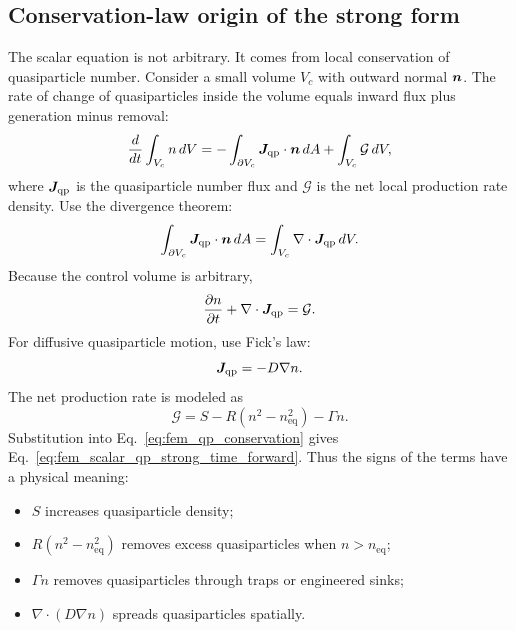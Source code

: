 \documentclass[11pt]{article}
\newcommand{\eq}{\mathrm{eq}}
\begin{document}
\subsection{Conservation-law origin of the strong form}
The scalar equation is not arbitrary. It comes from local conservation of quasiparticle number. Consider a small volume $V_c$ with outward normal $\bm{n}$. The rate of change of quasiparticles inside the volume equals inward flux plus generation minus removal:
\begin{equation}
\frac{d}{dt}\int_{V_c} n\,dV
= -\int_{\partial V_c}\bm{J}_{\mathrm{qp}}\cdot\bm{n}\,dA
+\int_{V_c} \mathcal{G}\,dV,
\end{equation}
where $\bm{J}_{\mathrm{qp}}$ is the quasiparticle number flux and $\mathcal{G}$ is the net local production rate density. Use the divergence theorem:
\begin{equation}
\int_{\partial V_c}\bm{J}_{\mathrm{qp}}\cdot\bm{n}\,dA
=\int_{V_c}\nabla\cdot\bm{J}_{\mathrm{qp}}\,dV.
\end{equation}
Because the control volume is arbitrary,
\begin{equation}
\frac{\partial n}{\partial t}+\nabla\cdot\bm{J}_{\mathrm{qp}}=\mathcal{G}.
\label{eq:fem_qp_conservation}
\end{equation}
For diffusive quasiparticle motion, use Fick's law:
\begin{equation}
\bm{J}_{\mathrm{qp}}=-D\nabla n.
\label{eq:fem_fick_qp}
\end{equation}
The net production rate is modeled as
\begin{equation}
\mathcal{G}=S-R(n^2-n_{\eq}^2)-\Gamma n.
\end{equation}
Substitution into Eq.~\eqref{eq:fem_qp_conservation} gives Eq.~\eqref{eq:fem_scalar_qp_strong_time_forward}. Thus the signs of the terms have a physical meaning:
\begin{itemize}[leftmargin=1.6em]
    \item $S$ increases quasiparticle density;
    \item $R(n^2-n_{\eq}^2)$ removes excess quasiparticles when $n>n_{\eq}$;
    \item $\Gamma n$ removes quasiparticles through traps or engineered sinks;
    \item $\nabla\cdot(D\nabla n)$ spreads quasiparticles spatially.
\end{itemize}
\end{document}
